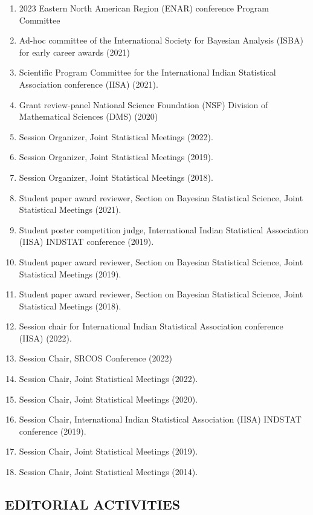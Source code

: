 \documentclass[12pt]{article}
\newcommand{\mydot}[1]{\begin{enumerate}[label=$\circ$,leftmargin=\parindent]\setlength{\itemsep}{#1}}
\newcommand{\ee}{\end{enumerate}}
\begin{document}
\mydot{-0.1em}
\item 2023 Eastern North American Region (ENAR) conference Program Committee 
\item Ad-hoc committee of the International Society for Bayesian Analysis (ISBA) for early career awards (2021)
\item Scientific Program Committee for the International Indian Statistical Association conference (IISA) (2021).
\item Grant review-panel National Science Foundation (NSF) Division of Mathematical Sciences (DMS) (2020)\\

\item Session Organizer, Joint Statistical Meetings (2022).
\item Session Organizer, Joint Statistical Meetings (2019).
\item Session Organizer, Joint Statistical Meetings (2018).\\

\item Student paper award reviewer, Section on Bayesian Statistical Science, Joint Statistical Meetings (2021).
\item Student poster competition judge, International Indian Statistical Association (IISA) INDSTAT conference (2019).
\item Student paper award reviewer, Section on Bayesian Statistical Science, Joint Statistical Meetings (2019).
\item Student paper award reviewer, Section on Bayesian Statistical Science, Joint Statistical Meetings (2018).\\

\item Session chair for International Indian Statistical Association conference (IISA) (2022).
\item Session Chair, SRCOS Conference (2022)
\item Session Chair, Joint Statistical Meetings (2022).
\item Session Chair, Joint Statistical Meetings (2020).
\item Session Chair, International Indian Statistical Association (IISA) INDSTAT conference (2019).
\item Session Chair, Joint Statistical Meetings (2019).
\item Session Chair, Joint Statistical Meetings (2014).
\ee

\subsection*{EDITORIAL ACTIVITIES}
\end{document}
